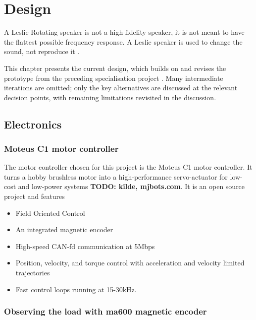 
\chapter{Design}

A Leslie Rotating speaker is not a high-fidelity speaker, it is not meant to have the flattest possible frequency response. A Leslie speaker is used to change the sound, not reproduce it \citep{TheatreOrgansMysteryLeslie}.

This chapter presents the current design, which builds on and revises the prototype from the preceding specialisation project \citep{horpedal2025projectthesis}. Many intermediate iterations are omitted; only the key alternatives are discussed at the relevant decision points, with remaining limitations revisited in the discussion.

\section{Electronics}

\subsection{Moteus C1 motor controller}
The motor controller chosen for this project is the Moteus C1 motor controller. It turns a hobby brushless motor into a high-performance servo-actuator for low-cost and low-power systems \textbf{TODO: kilde, mjbots.com}. It is an open source project and features
\begin{itemize}
	\item Field Oriented Control
	\item An integrated magnetic encoder
	\item High-speed CAN-fd communication at 5Mbps
	\item Position, velocity, and torque control with acceleration and velocity limited trajectories
	\item Fast control loops running at 15-30kHz.
\end{itemize}


\subsection{Observing the load with ma600 magnetic encoder}

